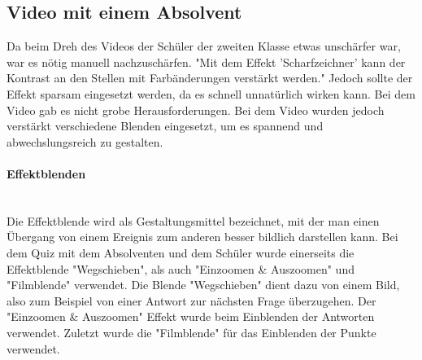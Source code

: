\subsection{Video mit einem Absolvent}
Da beim Dreh des Videos der Schüler der zweiten Klasse etwas unschärfer war, war es nötig manuell nachzuschärfen. "Mit dem Effekt 'Scharfzeichner' kann der Kontrast an den Stellen mit Farbänderungen verstärkt werden." Jedoch sollte der Effekt sparsam eingesetzt werden, da es schnell unnatürlich wirken kann. Bei dem Video gab es nicht grobe Herausforderungen. Bei dem Video wurden jedoch verstärkt verschiedene Blenden eingesetzt, um es spannend und abwechslungsreich zu gestalten. 
\paragraph{Effektblenden}
\leavevmode \\
Die Effektblende wird als Gestaltungsmittel bezeichnet, mit der man einen Übergang von einem Ereignis zum anderen besser bildlich darstellen kann. Bei dem Quiz mit dem Absolventen und dem Schüler wurde einerseits die Effektblende "Wegschieben", als auch "Einzoomen \& Auszoomen" und "Filmblende" verwendet. Die Blende "Wegschieben" dient dazu von einem Bild,  also zum Beispiel von einer Antwort zur nächsten Frage überzugehen. Der "Einzoomen \& Auszoomen" Effekt wurde beim Einblenden der Antworten verwendet. Zuletzt wurde die "Filmblende" für das Einblenden der Punkte verwendet.
